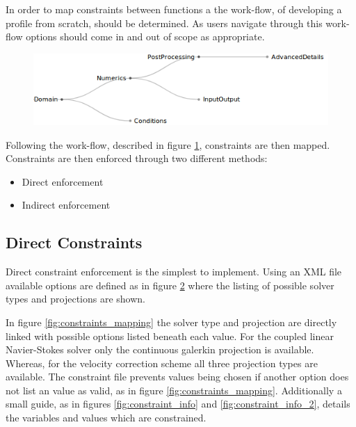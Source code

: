 \documentclass[11pt, a4paper]{report}
\begin{document}
In order to map constraints between functions a the work-flow, of developing a profile from scratch, should be determined. As users navigate through this work-flow options should come in and out of scope as appropriate.

\begin{figure}[htb!]
 \centering
 \includegraphics[width=.85\linewidth,  clip=true, trim = 0cm 0cm 0cm 0cm]{workflow}
 \label{fig:descision_flow}
\end{figure}

Following the work-flow, described in figure \ref{fig:descision_flow}, constraints are then mapped. Constraints are then enforced through two different methods:
\begin{itemize}
\item Direct enforcement
\item Indirect enforcement
\end{itemize}

\subsection{Direct Constraints}
Direct constraint enforcement is the simplest to implement. Using an XML file available options are defined as in figure \ref{fig:constraints_variables} where the listing of possible solver types and projections are shown.

\begin{figure}[htb!]
 \centering
 
 \label{fig:constraints_variables}
\end{figure}

In figure \ref{fig:constraints_mapping} the solver type and projection are directly linked with possible options listed beneath each value. For the coupled linear Navier-Stokes solver only the continuous galerkin projection is available. Whereas, for the velocity correction scheme all three projection types are available. The constraint file prevents values being chosen if another option does not list an value as valid, as in figure \ref{fig:constraints_mapping}. Additionally a small guide, as in figures \ref{fig:constraint_info} and \ref{fig:constraint_info_2}, details the variables and values which are constrained.
\end{document}
